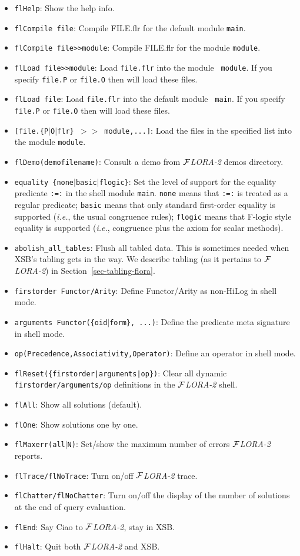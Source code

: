 \documentclass[11pt]{article}
\newcommand{\FLORA}{{\mbox{${\cal F}${\small\it LORA}\rm\emph{-2}}}\xspace}
\begin{document}
\begin{itemize}
\item {\tt flHelp}:
    Show the help info.
\item {\tt flCompile file}:
    Compile FILE.flr for the default module {\tt main}.
\item {\tt flCompile file>>module}:
    Compile FILE.flr for the module {\tt module}.
  \item {\tt flLoad file>>module}: Load {\tt file.flr} into the module {\tt
      module}. If you specify {\tt file.P} or {\tt file.O} then will load
    these files.
  \item {\tt flLoad file}: Load {\tt file.flr} into the default module {\tt
      main}. If you specify {\tt file.P} or {\tt file.O} then will load
    these files.
\item {\tt [file.\{P$|$O$|$flr\} $>>$ module,...]}:
    Load the files in the specified list into the module {\tt module}.
\item {\tt flDemo(demofilename)}:
    Consult a demo from \FLORA demos directory.
\item {\tt equality \{none$|$basic$|$flogic\}}:
    Set the level of support for the equality predicate {\tt :=:} in the
    shell module {\tt main}.
    {\tt none}  means that {\tt :=:} is treated as a regular
    predicate; {\tt basic} means that only standard first-order equality is
    supported ({\it i.e.}, the usual congruence rules); {\tt flogic} means
    that F-logic style equality is supported ({\it i.e.}, congruence plus
    the axiom for scalar methods).
\item {\tt abolish\_all\_tables}:
    Flush all tabled data. This is sometimes needed when XSB's tabling 
    gets in the way. We describe tabling (as it pertains to \FLORA) in
    Section~\ref{sec-tabling-flora}.
\item {\tt firstorder Functor/Arity}:
    Define Functor/Arity as non-HiLog in shell mode.
\item {\tt arguments Functor(\{oid$|$form\}, ...)}:
    Define the predicate meta signature in shell mode.
\item {\tt op(Precedence,Associativity,Operator)}:
    Define an operator in shell mode.
\item {\tt flReset(\{firstorder|arguments|op\})}:
    Clear all dynamic {\tt firstorder/arguments/op}  definitions in the
    \FLORA shell.
\item {\tt flAll}:
    Show all solutions (default).
\item {\tt flOne}:
    Show solutions one by one.
\item {\tt flMaxerr(all$|$N)}:
    Set/show the maximum number of errors \FLORA reports.
\item {\tt flTrace/flNoTrace}:
    Turn on/off \FLORA trace.
\item {\tt flChatter/flNoChatter}:
    Turn on/off the display of the number of solutions at the end of query
    evaluation.
\item {\tt flEnd}:
    Say Ciao to \FLORA, stay in XSB.
\item {\tt flHalt}:
    Quit both \FLORA and XSB.
\end{itemize}
%
\end{document}
